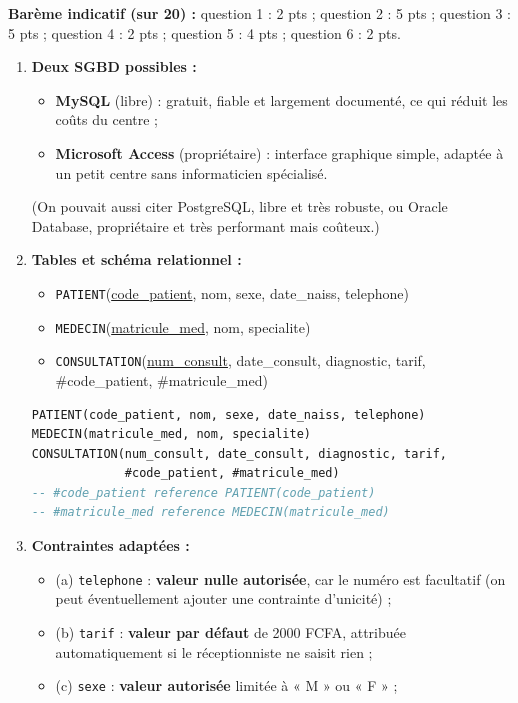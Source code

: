 \documentclass[11pt]{article}
\begin{document}
\begin{corrige}
\textbf{Barème indicatif (sur 20) :} question 1 : 2 pts ; question 2 : 5 pts ; question 3 : 5 pts ; question 4 : 2 pts ; question 5 : 4 pts ; question 6 : 2 pts.

\begin{enumerate}
\item \textbf{Deux SGBD possibles :}
\begin{itemize}
\item \textbf{MySQL} (libre) : gratuit, fiable et largement documenté, ce qui réduit les coûts du centre ;
\item \textbf{Microsoft Access} (propriétaire) : interface graphique simple, adaptée à un petit centre sans informaticien spécialisé.
\end{itemize}
(On pouvait aussi citer PostgreSQL, libre et très robuste, ou Oracle Database, propriétaire et très performant mais coûteux.)
\item \textbf{Tables et schéma relationnel :}
\begin{itemize}
\item \texttt{PATIENT}(\underline{code\_patient}, nom, sexe, date\_naiss, telephone)
\item \texttt{MEDECIN}(\underline{matricule\_med}, nom, specialite)
\item \texttt{CONSULTATION}(\underline{num\_consult}, date\_consult, diagnostic, tarif, \#code\_patient, \#matricule\_med)
\end{itemize}
\begin{lstlisting}[language=SQL]
PATIENT(code_patient, nom, sexe, date_naiss, telephone)
MEDECIN(matricule_med, nom, specialite)
CONSULTATION(num_consult, date_consult, diagnostic, tarif,
             #code_patient, #matricule_med)
-- #code_patient reference PATIENT(code_patient)
-- #matricule_med reference MEDECIN(matricule_med)
\end{lstlisting}
\item \textbf{Contraintes adaptées :}
\begin{itemize}
\item (a) \texttt{telephone} : \textbf{valeur nulle autorisée}, car le numéro est facultatif (on peut éventuellement ajouter une contrainte d'unicité) ;
\item (b) \texttt{tarif} : \textbf{valeur par défaut} de \num{2000} FCFA, attribuée automatiquement si le réceptionniste ne saisit rien ;
\item (c) \texttt{sexe} : \textbf{valeur autorisée} limitée à « M » ou « F » ;

\end{itemize}
\end{enumerate}
\end{corrige}
\end{document}
